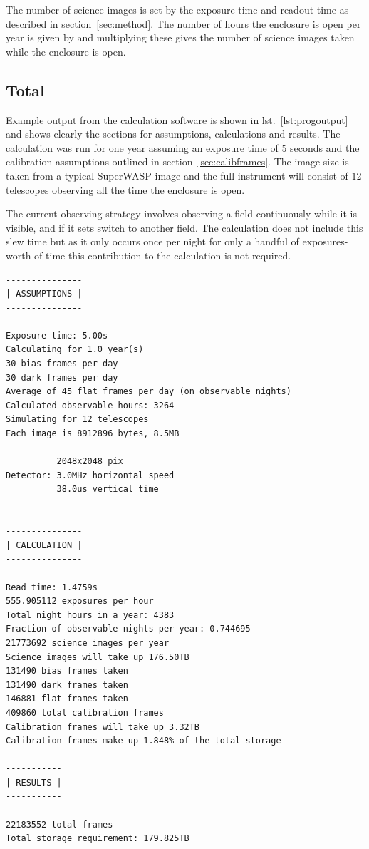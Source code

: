 \documentclass[11pt,a4paper]{report}
\begin{document}
The number of science images is set by the exposure time and readout
time as described in section~\ref{sec:method}. The number of hours the
enclosure is open per year is given by \citep{bento11} and multiplying
these gives the number of science images taken while the enclosure is
open.

\subsection{Total}


Example output from the calculation software is shown in
lst.~\ref{lst:progoutput} and shows clearly the sections for
assumptions, calculations and results. The calculation was run 
for one year assuming an exposure time of $5$ seconds and the
calibration assumptions outlined in section~\ref{sec:calibframes}. The
image size is taken from a typical SuperWASP image and the full
instrument will consist of $12$ telescopes observing all the time the
enclosure is open. 

The current observing strategy involves observing a field continuously
while it is visible, and if it sets switch to another field. The
calculation does not include this slew time but as it only occurs
once per night for only a handful of exposures-worth of time this
contribution to the calculation is not required.



\begin{lstlisting}[caption=Example output from the simulation software.
    The exposure time is set to $5$ seconds and the NGTS detector was
    chosen.,
label=lst:progoutput]
---------------
| ASSUMPTIONS |
---------------

Exposure time: 5.00s
Calculating for 1.0 year(s)
30 bias frames per day
30 dark frames per day
Average of 45 flat frames per day (on observable nights)
Calculated observable hours: 3264
Simulating for 12 telescopes
Each image is 8912896 bytes, 8.5MB

          2048x2048 pix
Detector: 3.0MHz horizontal speed
          38.0us vertical time


---------------
| CALCULATION |
---------------

Read time: 1.4759s
555.905112 exposures per hour
Total night hours in a year: 4383
Fraction of observable nights per year: 0.744695
21773692 science images per year
Science images will take up 176.50TB
131490 bias frames taken
131490 dark frames taken
146881 flat frames taken
409860 total calibration frames
Calibration frames will take up 3.32TB
Calibration frames make up 1.848% of the total storage

-----------
| RESULTS |
-----------

22183552 total frames
Total storage requirement: 179.825TB
\end{lstlisting}



\end{document}

